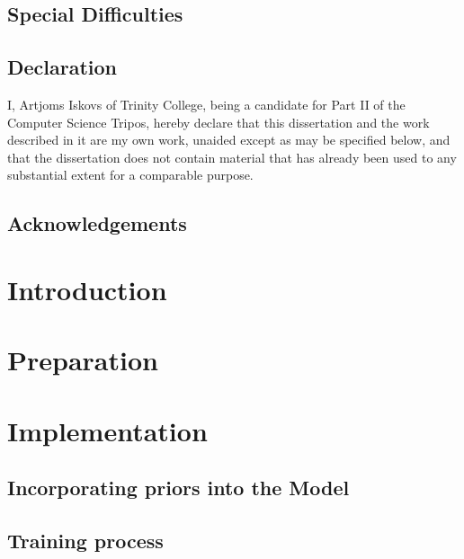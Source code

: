 \documentclass[12pt,a4paper,twoside,openright]{report}
\begin{document}
\section*{Special Difficulties}
 
\newpage
\section*{Declaration}

I, Artjoms Iskovs of Trinity College, being a candidate for Part II of the Computer
Science Tripos, hereby declare that this dissertation and the work described in it are my own work,
unaided except as may be specified below, and that the dissertation does not contain material that has already been used to any substantial
extent for a comparable purpose.

\bigskip
{}

\medskip
{}

\tableofcontents

\listoffigures

\newpage
\section*{Acknowledgements}



\pagestyle{headings}

\chapter{Introduction}

\chapter{Preparation}

\chapter{Implementation}

\section{Incorporating priors into the Model}

\section{Training process}
\end{document}
